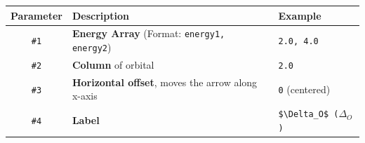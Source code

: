 \documentclass[12pt, a4paper]{article}
\begin{document}
\begin{center}
    \begin{tabular}{|c| p{7cm} |p{3cm}|}
        \hline
        Parameter    & Description                                               & Example                                           \\ [0.5ex]
        \hline%
        \texttt{\#1} & \textbf{Energy Array} (Format: \texttt{energy1, energy2}) & \texttt{2.0, 4.0}                                 \\
        \hline
        \texttt{\#2} & \textbf{Column} of orbital                                & \texttt{2.0}
        \\
        \hline
        \texttt{\#3} & \textbf{Horizontal offset}, moves the arrow along x-axis  & \texttt{0} (centered)                             \\
        \hline
        \texttt{\#4} & \textbf{Label}                                            & \texttt{\$\textbackslash Delta\_O\$ ($\Delta_O$)} \\ [1ex]
        \hline
    \end{tabular}
\end{center}

\begin{figure}[H]
    \centering
    \begin{mohelper}[scale=0.8]
        \def\columndistance{0.7}
        \def\diagrammode{normal}
    \end{mohelper}
    \label{fig:modiagram5}
\end{figure}
\end{document}
